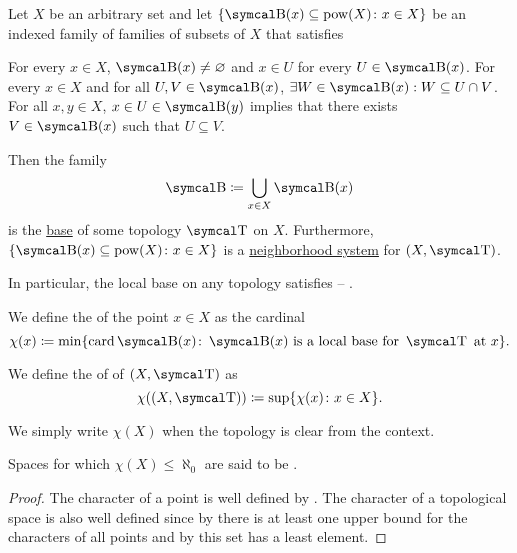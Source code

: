 \begin{proposition}\label{thm:topological_local_base_axioms}
  Let \( X \) be an arbitrary set and let \( \{ \CB(x) \subseteq \Pow(X) \colon x \in X \} \) be an indexed family of families of subsets of \( X \) that satisfies
  \begin{DefEnum}
     For every \( x \in X \), \( \CB(x) \neq \varnothing \) and \( x \in U \) for every \( U \in \CB(x) \).
     For every \( x \in X \) and for all \( U, V \in \CB(x) \), \( \exists W \in \CB(x): W \subseteq U \cap V \).
     For all \( x, y \in X \), \( x \in U \in \CB(y) \) implies that there exists \( V \in \CB(x) \) such that \( U \subseteq V \).
  \end{DefEnum}

  Then the family
  \begin{equation*}
    \CB \coloneqq \bigcup_{x \in X} \CB(x)
  \end{equation*}
  is the \hyperref[thm:topological_base_axioms]{base} of some topology \( \CT \) on \( X \). Furthermore, \( \{ \CB(x) \subseteq \Pow(X) \colon x \in X \} \) is a \hyperref[def:topological_local_base]{neighborhood system} for \( (X, \CT) \).

  In particular, the local base on any topology satisfies  -- .
\end{proposition}

\begin{definition}\label{def:topological_space_character}
  We define the  of the point \( x \in X \) as the cardinal
  \begin{equation*}
    \chi(x) \coloneqq \min \{ \Card \CB(x) \colon \CB(x) \text{ is a local base for } \CT \text{ at } x \}.
  \end{equation*}

  We define the  of of \( (X, \CT) \) as
  \begin{equation*}
    \chi((X, \CT)) \coloneqq \sup \{ \chi(x) \colon x \in X \}.
  \end{equation*}

  We simply write \( \chi(X) \) when the topology is clear from the context.

  Spaces for which \( \chi(X) \leq \aleph_0 \) are said to be .
\end{definition}
\begin{proof}
  The character of a point is well defined by . The character of a topological space is also well defined since by  there is at least one upper bound for the characters of all points and by  this set has a least element.
\end{proof}

